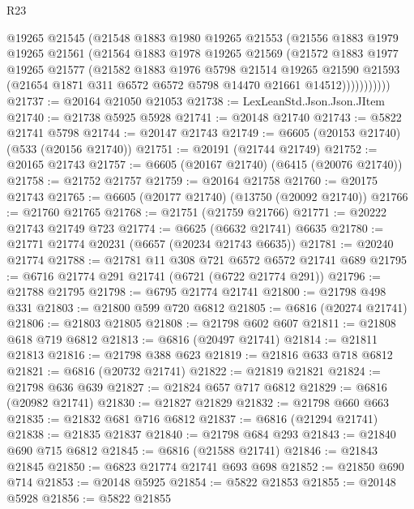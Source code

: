 \begin{lexlean}{R23}
\begin{coremodule}
              @19265
              @21545
              (@21548
                @1883
                @1980
                @19265
                @21553
                (@21556
                  @1883
                  @1979
                  @19265
                  @21561
                  (@21564
                    @1883
                    @1978
                    @19265
                    @21569
                    (@21572
                      @1883
                      @1977
                      @19265
                      @21577
                      (@21582
                        @1883
                        @1976
                        @5798
                        @21514
                        @19265
                        @21590
                        @21593
                        (@21654 @1871 @311 @6572 @6572 @5798 @14470 @21661 @14512)))))))))))
@21737 := @20164 @21050 @21053
@21738 := LexLeanStd.Json.Json.JItem
@21740 := @21738 @5925 @5928
@21741 := @20148 @21740
@21743 := @5822 @21741 @5798
@21744 := @20147 @21743
@21749 := @6605 (@20153 @21740) (@533 (@20156 @21740))
@21751 := @20191 (@21744 @21749)
@21752 := @20165 @21743
@21757 := @6605 (@20167 @21740) (@6415 (@20076 @21740))
@21758 := @21752 @21757
@21759 := @20164 @21758
@21760 := @20175 @21743
@21765 := @6605 (@20177 @21740) (@13750 (@20092 @21740))
@21766 := @21760 @21765
@21768 := @21751 (@21759 @21766)
@21771 := @20222 @21743 @21749 @723
@21774 := @6625 (@6632 @21741) @6635
@21780 := @21771 @21774 @20231 (@6657 (@20234 @21743 @6635))
@21781 := @20240 @21774
@21788 := @21781 @11 @308 @721 @6572 @6572 @21741 @689
@21795 := @6716 @21774 @291 @21741 (@6721 (@6722 @21774 @291))
@21796 := @21788 @21795
@21798 := @6795 @21774 @21741
@21800 := @21798 @498 @331
@21803 := @21800 @599 @720 @6812
@21805 := @6816 (@20274 @21741)
@21806 := @21803 @21805
@21808 := @21798 @602 @607
@21811 := @21808 @618 @719 @6812
@21813 := @6816 (@20497 @21741)
@21814 := @21811 @21813
@21816 := @21798 @388 @623
@21819 := @21816 @633 @718 @6812
@21821 := @6816 (@20732 @21741)
@21822 := @21819 @21821
@21824 := @21798 @636 @639
@21827 := @21824 @657 @717 @6812
@21829 := @6816 (@20982 @21741)
@21830 := @21827 @21829
@21832 := @21798 @660 @663
@21835 := @21832 @681 @716 @6812
@21837 := @6816 (@21294 @21741)
@21838 := @21835 @21837
@21840 := @21798 @684 @293
@21843 := @21840 @690 @715 @6812
@21845 := @6816 (@21588 @21741)
@21846 := @21843 @21845
@21850 := @6823 @21774 @21741 @693 @698
@21852 := @21850 @690 @714
@21853 := @20148 @5925
@21854 := @5822 @21853
@21855 := @20148 @5928
@21856 := @5822 @21855

\end{coremodule}
\end{lexlean}
